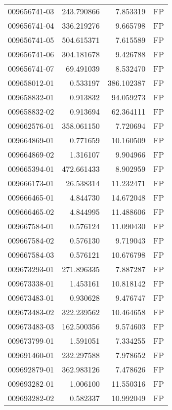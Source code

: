 \begin{tabular}{lrrl}
009656741-03 &  243.790866 &       7.853319 &   FP \\
009656741-04 &  336.219276 &       9.665798 &   FP \\
009656741-05 &  504.615371 &       7.615589 &   FP \\
009656741-06 &  304.181678 &       9.426788 &   FP \\
009656741-07 &   69.491039 &       8.532470 &   FP \\
009658012-01 &    0.533197 &     386.102387 &   FP \\
009658832-01 &    0.913832 &      94.059273 &   FP \\
009658832-02 &    0.913694 &      62.364111 &   FP \\
009662576-01 &  358.061150 &       7.720694 &   FP \\
009664869-01 &    0.771659 &      10.160509 &   FP \\
009664869-02 &    1.316107 &       9.904966 &   FP \\
009665394-01 &  472.661433 &       8.902959 &   FP \\
009666173-01 &   26.538314 &      11.232471 &   FP \\
009666465-01 &    4.844730 &      14.672048 &   FP \\
009666465-02 &    4.844995 &      11.488606 &   FP \\
009667584-01 &    0.576124 &      11.090430 &   FP \\
009667584-02 &    0.576130 &       9.719043 &   FP \\
009667584-03 &    0.576121 &      10.676798 &   FP \\
009673293-01 &  271.896335 &       7.887287 &   FP \\
009673338-01 &    1.453161 &      10.818142 &   FP \\
009673483-01 &    0.930628 &       9.476747 &   FP \\
009673483-02 &  322.239562 &      10.464658 &   FP \\
009673483-03 &  162.500356 &       9.574603 &   FP \\
009673799-01 &    1.591051 &       7.334255 &   FP \\
009691460-01 &  232.297588 &       7.978652 &   FP \\
009692879-01 &  362.983126 &       7.478626 &   FP \\
009693282-01 &    1.006100 &      11.550316 &   FP \\
009693282-02 &    0.582337 &      10.992049 &   FP \\

\end{tabular}
